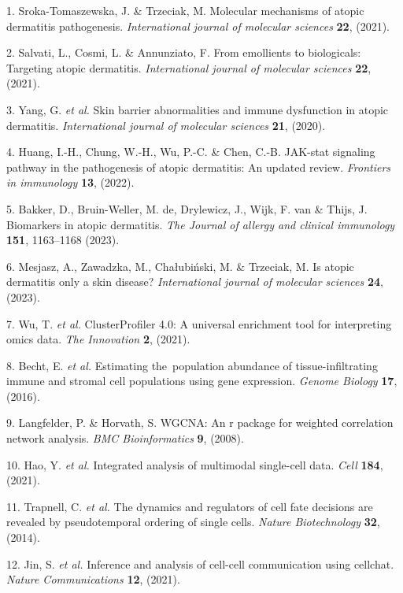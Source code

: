 \documentclass[
]{article}
\newenvironment{cslreferences}%
  {}%
  {\par}
\begin{document}
\hypertarget{refs}{}
\begin{cslreferences}
\leavevmode\hypertarget{ref-MolecularMechaSroka2021}{}%
1. Sroka-Tomaszewska, J. \& Trzeciak, M. Molecular mechanisms of atopic dermatitis pathogenesis. \emph{International journal of molecular sciences} \textbf{22}, (2021).

\leavevmode\hypertarget{ref-FromEmollientsSalvat2021}{}%
2. Salvati, L., Cosmi, L. \& Annunziato, F. From emollients to biologicals: Targeting atopic dermatitis. \emph{International journal of molecular sciences} \textbf{22}, (2021).

\leavevmode\hypertarget{ref-SkinBarrierAbYang2020}{}%
3. Yang, G. \emph{et al.} Skin barrier abnormalities and immune dysfunction in atopic dermatitis. \emph{International journal of molecular sciences} \textbf{21}, (2020).

\leavevmode\hypertarget{ref-JakStatSignalHuang2022}{}%
4. Huang, I.-H., Chung, W.-H., Wu, P.-C. \& Chen, C.-B. JAK-stat signaling pathway in the pathogenesis of atopic dermatitis: An updated review. \emph{Frontiers in immunology} \textbf{13}, (2022).

\leavevmode\hypertarget{ref-BiomarkersInABakker2023}{}%
5. Bakker, D., Bruin-Weller, M. de, Drylewicz, J., Wijk, F. van \& Thijs, J. Biomarkers in atopic dermatitis. \emph{The Journal of allergy and clinical immunology} \textbf{151}, 1163--1168 (2023).

\leavevmode\hypertarget{ref-IsAtopicDermaMesjas2023}{}%
6. Mesjasz, A., Zawadzka, M., Chałubiński, M. \& Trzeciak, M. Is atopic dermatitis only a skin disease? \emph{International journal of molecular sciences} \textbf{24}, (2023).

\leavevmode\hypertarget{ref-ClusterprofilerWuTi2021}{}%
7. Wu, T. \emph{et al.} ClusterProfiler 4.0: A universal enrichment tool for interpreting omics data. \emph{The Innovation} \textbf{2}, (2021).

\leavevmode\hypertarget{ref-EstimatingTheBecht2016}{}%
8. Becht, E. \emph{et al.} Estimating the~population abundance of tissue-infiltrating immune and stromal cell populations using gene expression. \emph{Genome Biology} \textbf{17}, (2016).

\leavevmode\hypertarget{ref-WgcnaAnRPacLangfe2008}{}%
9. Langfelder, P. \& Horvath, S. WGCNA: An r package for weighted correlation network analysis. \emph{BMC Bioinformatics} \textbf{9}, (2008).

\leavevmode\hypertarget{ref-IntegratedAnalHaoY2021}{}%
10. Hao, Y. \emph{et al.} Integrated analysis of multimodal single-cell data. \emph{Cell} \textbf{184}, (2021).

\leavevmode\hypertarget{ref-TheDynamicsAnTrapne2014}{}%
11. Trapnell, C. \emph{et al.} The dynamics and regulators of cell fate decisions are revealed by pseudotemporal ordering of single cells. \emph{Nature Biotechnology} \textbf{32}, (2014).

\leavevmode\hypertarget{ref-InferenceAndAJinS2021}{}%
12. Jin, S. \emph{et al.} Inference and analysis of cell-cell communication using cellchat. \emph{Nature Communications} \textbf{12}, (2021).
\end{cslreferences}
\end{document}
